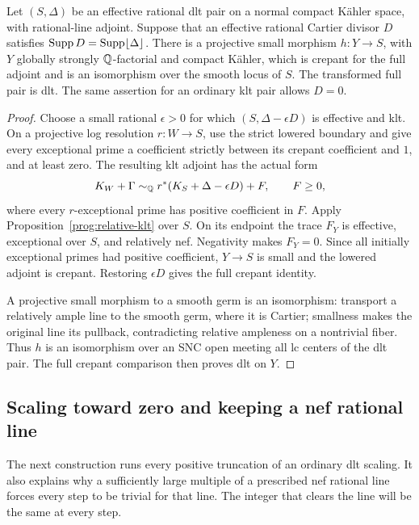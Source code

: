 \begin{corollary}\label{prog:small-model}
Let \((S,\Delta)\) be an effective rational dlt pair on a normal
compact Kähler space, with rational-line adjoint. Suppose that an effective
rational Cartier divisor \(D\) satisfies
\(\operatorname{Supp} D=\operatorname{Supp}\lfloor\Delta\rfloor\). There is a projective small morphism
\(h:Y\to S\), with \(Y\) globally strongly \(\mathbb Q\)-factorial and
compact Kähler, which is crepant for the full adjoint and is an
isomorphism over the smooth locus of \(S\).  The transformed full
pair is dlt.  The same assertion for an ordinary klt pair allows
\(D=0\).
\end{corollary}

\begin{proof}
Choose a small rational \(\epsilon>0\) for which
\((S,\Delta-\epsilon D)\) is effective and klt.  On a projective log
resolution \(r:W\to S\), use the strict lowered boundary and give
every exceptional prime a coefficient strictly between its crepant
coefficient and \(1\), and at least zero.  The resulting klt adjoint
has the actual form
\[
 K_W+\Gamma\sim_{\mathbb Q}r^*(K_S+\Delta-\epsilon D)+F,
 \qquad F\geq0,
\]
where every \(r\)-exceptional prime has positive coefficient in
\(F\).  Apply Proposition~\ref{prog:relative-klt} over \(S\).
On its endpoint the trace \(F_Y\) is effective, exceptional over
\(S\), and relatively nef.  Negativity makes \(F_Y=0\).
Since all initially exceptional primes had positive coefficient,
\(Y\to S\) is small and the lowered adjoint is crepant.
Restoring \(\epsilon D\) gives the full crepant identity.

A projective small morphism to a smooth germ is an isomorphism:
transport a relatively ample line to the smooth germ, where it is
Cartier; smallness makes the original line its pullback, contradicting
relative ampleness on a nontrivial fiber.  Thus \(h\) is an isomorphism
over an SNC open meeting all lc centers of the dlt pair.  The full
crepant comparison then proves dlt on \(Y\).
\end{proof}

\subsection{Scaling toward zero and keeping a nef rational line}

The next construction runs every positive truncation of an ordinary
dlt scaling.  It also explains why a sufficiently large multiple of
a prescribed nef rational line forces every step to be trivial for
that line.  The integer that clears the line will be the same at
every step.


